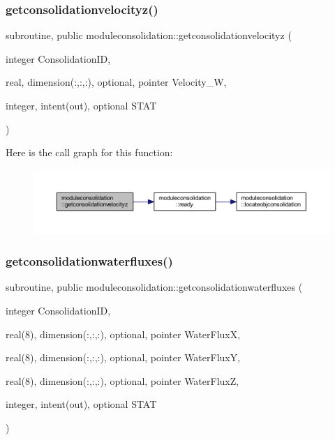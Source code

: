 \subsubsection{\texorpdfstring{getconsolidationvelocityz()}{getconsolidationvelocityz()}}
{\footnotesize\ttfamily subroutine, public moduleconsolidation\+::getconsolidationvelocityz (\begin{DoxyParamCaption}\item[{integer}]{Consolidation\+ID,  }\item[{real, dimension(\+:,\+:,\+:), optional, pointer}]{Velocity\+\_\+W,  }\item[{integer, intent(out), optional}]{S\+T\+AT }\end{DoxyParamCaption})}

Here is the call graph for this function\+:\nopagebreak
\begin{figure}[H]
\begin{center}
\leavevmode
\includegraphics[width=350pt]{namespacemoduleconsolidation_a1a8c6ae3e68c283ceaaa0a81fb8f531b_cgraph}
\end{center}
\end{figure}
\mbox{\label{namespacemoduleconsolidation_ab2cf2636db758f412f7c627b38eb6231}} 
\subsubsection{\texorpdfstring{getconsolidationwaterfluxes()}{getconsolidationwaterfluxes()}}
{\footnotesize\ttfamily subroutine, public moduleconsolidation\+::getconsolidationwaterfluxes (\begin{DoxyParamCaption}\item[{integer}]{Consolidation\+ID,  }\item[{real(8), dimension(\+:,\+:,\+:), optional, pointer}]{Water\+FluxX,  }\item[{real(8), dimension(\+:,\+:,\+:), optional, pointer}]{Water\+FluxY,  }\item[{real(8), dimension(\+:,\+:,\+:), optional, pointer}]{Water\+FluxZ,  }\item[{integer, intent(out), optional}]{S\+T\+AT }\end{DoxyParamCaption})}

